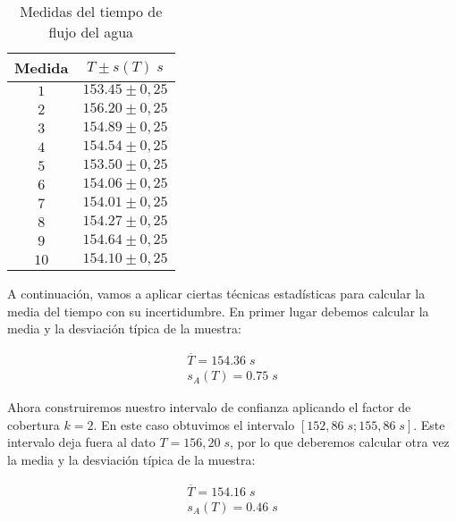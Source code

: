 \documentclass[a4paper,12pt,titlepage]{article}
\begin{document}
\begin{table}[h!]
    \centering
    \begin{tabular}{|c|c|}
    \hline
    Medida & $T \pm s(T) \; s$\\ \hline
    $1$    & $153.45\pm0,25$ \\ \hline
    $2$    & $156.20\pm0,25$ \\ \hline
    $3$    & $154.89\pm0,25$ \\ \hline
    $4$    & $154.54\pm0,25$ \\ \hline
    $5$    & $153.50\pm0,25$ \\ \hline
    $6$    & $154.06\pm0,25$ \\ \hline
    $7$    & $154.01\pm0,25$ \\ \hline
    $8$    & $154.27\pm0,25$ \\ \hline
    $9$    & $154.64\pm0,25$ \\ \hline
    $10$   & $154.10\pm0,25$ \\ \hline
    \end{tabular}
    \caption{Medidas del tiempo de flujo del agua}
    \label{Tiempos agua}
    \end{table}

    A continuación, vamos a aplicar ciertas técnicas estadísticas para calcular la media del tiempo con su incertidumbre. En primer lugar debemos calcular la media y la desviación típica de la muestra:

    \begin{equation}
        \begin{gathered}
            \overline{T} = 154.36 \; s \\
            s_A (T) = 0.75 \; s
        \end{gathered}
    \end{equation}
    
    Ahora construiremos nuestro intervalo de confianza aplicando el factor de cobertura $k=2$. En este caso obtuvimos el intervalo $[152,86\; s;155,86\; s]$. Este intervalo deja fuera al dato $T=156,20 \; s$, por lo que deberemos calcular otra vez la media y la desviación típica de la muestra:
    
    \begin{equation}
        \begin{gathered}
            \overline{T} = 154.16 \; s \\
            s_A (T) = 0.46 \; s
        \end{gathered}
    \end{equation}
    
\end{document}
